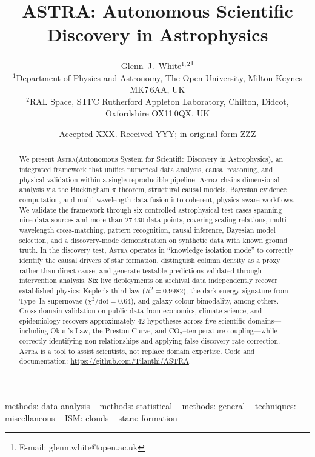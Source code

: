 \documentclass[usenatbib]{rasti}
\title[ASTRA: Autonomous Scientific Discovery in Astrophysics]{ASTRA: Autonomous Scientific Discovery in Astrophysics}
\author[White]{
Glenn~J.~White$^{1,2}$\thanks{E-mail: glenn.white@open.ac.uk}\\
$^{1}$Department of Physics and Astronomy, The Open University, Milton Keynes MK7\,6AA, UK\\
$^{2}$RAL Space, STFC Rutherford Appleton Laboratory, Chilton, Didcot, Oxfordshire OX11\,0QX, UK
}
\date{Accepted XXX. Received YYY; in original form ZZZ}
\newcommand{\astra}{\textsc{Astra}\xspace}
\begin{document}
\maketitle

\begin{abstract}
We present \astra (Autonomous System for Scientific Discovery in Astrophysics), an integrated framework that unifies numerical data analysis, causal reasoning, and physical validation within a single reproducible pipeline.
\astra chains dimensional analysis via the Buckingham $\pi$ theorem, structural causal models, Bayesian evidence computation, and multi-wavelength data fusion into coherent, physics-aware workflows.
We validate the framework through six controlled astrophysical test cases spanning nine data sources and more than 27\,430 data points, covering scaling relations, multi-wavelength cross-matching, pattern recognition, causal inference, Bayesian model selection, and a discovery-mode demonstration on synthetic data with known ground truth.
In the discovery test, \astra operates in ``knowledge isolation mode'' to correctly identify the causal drivers of star formation, distinguish column density as a proxy rather than direct cause, and generate testable predictions validated through intervention analysis.
Six live deployments on archival data independently recover established physics: Kepler's third law ($R^{2}=0.9982$), the dark energy signature from Type~Ia supernovae ($\chi^{2}/\mathrm{dof}=0.64$), and galaxy colour bimodality, among others.
Cross-domain validation on public data from economics, climate science, and epidemiology recovers approximately 42 hypotheses across five scientific domains---including Okun's Law, the Preston Curve, and CO$_{2}$--temperature coupling---while correctly identifying non-relationships and applying false discovery rate correction.
\astra is a tool to assist scientists, not replace domain expertise.
Code and documentation: \url{https://github.com/Tilanthi/ASTRA}.
\end{abstract}

\begin{keywords}
methods: data analysis -- methods: statistical -- methods: general -- techniques: miscellaneous -- ISM: clouds -- stars: formation
\end{keywords}

\end{document}
